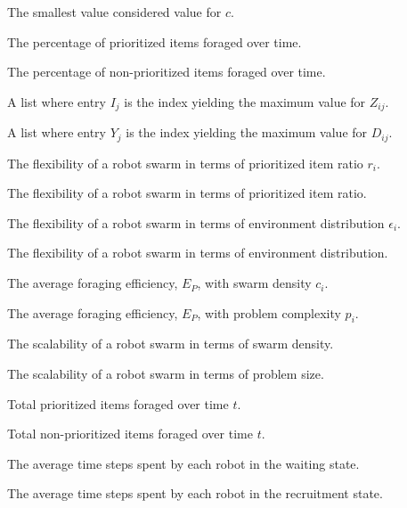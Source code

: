 \begin{description}
	\item[\parbox{\namewidth}{$c_{min}$}] The smallest value considered value for $c$.
	
	\item[\parbox{\namewidth}{$E_P$}] The percentage of prioritized items foraged over time.

	\item[\parbox{\namewidth}{$E_{NP}$}] The percentage of non-prioritized items foraged over time.

	\item[\parbox{\namewidth}{$I$}] A list where entry $I_j$ is the index yielding the maximum value for $Z_{ij}$.

	\item[\parbox{\namewidth}{$Y$}] A list where entry $Y_j$ is the index yielding the maximum value for $D_{ij}$.

	\item[\parbox{\namewidth}{$F_{r_i}$}] The flexibility of a robot swarm in terms of prioritized item ratio $r_i$.

	\item[\parbox{\namewidth}{$F_r$}] The flexibility of a robot swarm in terms of prioritized item ratio.

	\item[\parbox{\namewidth}{$F_{\epsilon_i}$}] The flexibility of a robot swarm in terms of environment distribution $\epsilon_i$.

	\item[\parbox{\namewidth}{$F_\epsilon$}] The flexibility of a robot swarm in terms of environment distribution.

	\item[\parbox{\namewidth}{$E_{c_i}$}] The average foraging efficiency, $E_P$, with swarm density $c_i$.

	\item[\parbox{\namewidth}{$E_{p_i}$}] The average foraging efficiency, $E_P$, with problem complexity $p_i$.

	\item[\parbox{\namewidth}{$S_c$}] The scalability of a robot swarm in terms of swarm density.	
	
	\item[\parbox{\namewidth}{$S_p$}] The scalability of a robot swarm in terms of problem size.	
	
	\item[\parbox{\namewidth}{$E^t_P$}] Total prioritized items foraged over time $t$.	

	\item[\parbox{\namewidth}{$E^t_{NP}$}] Total non-prioritized items foraged over time $t$.	
	
	\item[\parbox{\namewidth}{$t_{wait}$}] The average time steps spent by each robot in the waiting state.

	\item[\parbox{\namewidth}{$t_{recruitment}$}] The average time steps spent by each robot in the recruitment state. 
	
	

\end{description}
